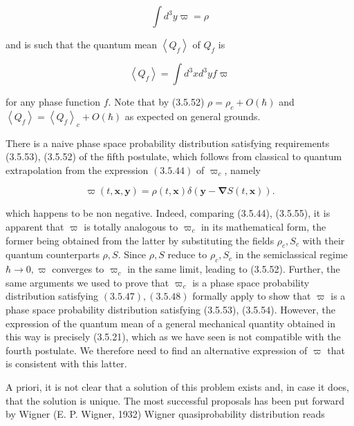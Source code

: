 \documentclass{article}
\begin{document}
\begin{equation*}
\int d^{3} y \varpi=\rho \tag{3.5.53}
\end{equation*}
 
and is such that the quantum mean $\left\langle Q_{f}\right\rangle$ of $Q_{f}$ is
 
\begin{equation*}
\left\langle Q_{f}\right\rangle=\int d^{3} x d^{3} y f \varpi \tag{3.5.54}
\end{equation*}
 
for any phase function $f$.
Note that by (3.5.52) $\rho=\rho_{c}+O(\hbar)$ and $\left\langle Q_{f}\right\rangle=\left\langle Q_{f}\right\rangle_{c}+O(\hbar)$ as expected on general grounds.

There is a naive phase space probability distribution satisfying requirements (3.5.53), (3.5.52) of the fifth postulate, which follows from classical to quantum
extrapolation from the expression $(3.5 .44)$ of $\varpi_{c}$, namely
 
\begin{equation*}
\varpi(t, \boldsymbol{x}, \boldsymbol{y})=\rho(t, \boldsymbol{x}) \delta(\boldsymbol{y}-\boldsymbol{\nabla} S(t, \boldsymbol{x})) . \tag{3.5.55}
\end{equation*}
 
which happens to be non negative. Indeed, comparing (3.5.44), (3.5.55), it is apparent that $\varpi$ is totally analogous to $\varpi_{c}$ in its mathematical form, the former being obtained from the latter by substituting the fields $\rho_{c}, S_{c}$ with their quantum counterparts $\rho, S$. Since $\rho, S$ reduce to $\rho_{c}, S_{c}$ in the semiclassical regime $\hbar \rightarrow 0, \varpi$ converges to $\varpi_{c}$ in the same limit, leading to (3.5.52). Further, the same arguments we used to prove that $\varpi_{c}$ is a phase space probability distribution satisfying $(3.5 .47),(3.5 .48)$ formally apply to show that $\varpi$ is a phase space probability distribution satisfying (3.5.53), (3.5.54). However, the expression of the quantum mean of a general mechanical quantity obtained in this way is precisely (3.5.21), which as we have seen is not compatible with the fourth postulate. We therefore need to find an alternative expression of $\varpi$ that is consistent with this latter.

A priori, it is not clear that a solution of this problem exists and, in case it does, that the solution is unique. The most successful proposals has been put forward by Wigner (E. P. Wigner, 1932) Wigner quasiprobability distribution reads
 
\end{document}

